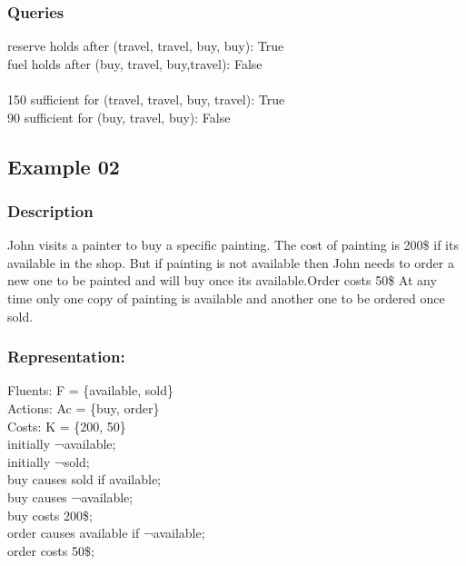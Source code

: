 \documentclass[11pt]{article}
\begin{document}
	\subsubsection{Queries}
	reserve holds after (travel, travel, buy, buy): True\\
	fuel holds after (buy, travel, buy,travel): False\\
	\\
	150 sufficient for (travel, travel, buy, travel): True\\
	90 sufficient for (buy, travel, buy): False\\
	\subsection{Example 02}\label{example:ex02}
	\subsubsection{Description}\label{par:p102}
	John visits a painter to buy a specific painting. The cost of painting is 200\$ if its available in the shop. But if painting is not available then John needs to order a new one to be painted and will buy once its available.Order costs 50\$ At any time only one copy of painting is available and another one to be ordered once sold. 
	
	\subsubsection{Representation:}\label{par:p202}
	\indent 
	Fluents: F = \{available, sold\}\\
	Actions: Ac = \{buy, order\}\\
	Costs: K = \{200, 50\}\\
	initially ¬available;\\
	initially ¬sold;\\
	buy causes sold if available;\\
	buy causes ¬available;\\
	buy costs 200\$;\\
	order causes available if ¬available;\\
	order costs 50\$; \\
	
\end{document}
